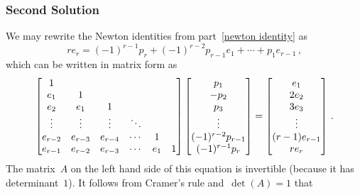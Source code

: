 \subsubsection{Second Solution}

We may rewrite the Newton identities from part~\ref{newton identity} as
\[
    r e_r
  =   (-1)^{r-1} p_r
    + (-1)^{r-2} p_{r-1} e_1
    + \dotsb
    + p_1 e_{r-1} \,,
\]
which can be written in matrix form as
\[
  \begin{bmatrix}
    1       &         &         &         &     &   \\
    e_1     & 1       &         &         &     &   \\
    e_2     & e_1     & 1       &         &     &   \\
    \vdots  & \vdots  & \vdots  & \ddots  &     &   \\
    e_{r-2} & e_{r-3} & e_{r-4} & \cdots  & 1   &   \\
    e_{r-1} & e_{r-2} & e_{r-3} & \cdots  & e_1 & 1
  \end{bmatrix}
  \begin{bmatrix} p_1 \\ -p_2 \\ p_3 \\ \vdots \\ (-1)^{r-2} p_{r-1} \\ (-1)^{r-1} p_r \end{bmatrix}
  =
  \begin{bmatrix} e_1 \\ 2 e_2 \\ 3 e_3 \\ \vdots \\ (r-1) e_{r-1} \\ r e_r \end{bmatrix} \,.
\]
The matrix~$A$ on the left hand side of this equation is invertible (because it has determinant~$1$).
It follows from Cramer’s rule and~$\det(A) = 1$ that
\begingroup
\allowdisplaybreaks
